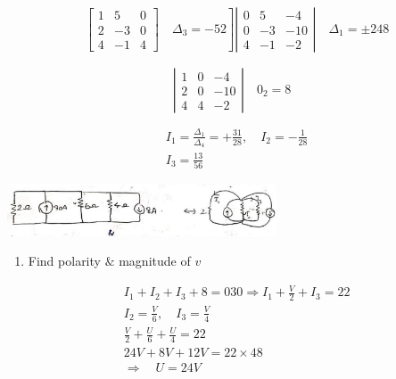 \documentclass[12pt, a4paper]{article}
\newcommand{\figwidth}{8cm}
\begin{document}
$$
	\begin{aligned}
		 & \left.\left[\begin{array}{ccc}
				               1 & 5  & 0 \\
				               2 & -3 & 0 \\
				               4 & -1 & 4
			               \end{array}\right] \quad \Delta_{3}=-52\right]\left|\begin{array}{ccc}
			                                                                   0 & 5  & -4  \\
			                                                                   0 & -3 & -10 \\
			                                                                   4 & -1 & -2
		                                                                   \end{array}\right| \quad \Delta_{1}= \pm 248
	\end{aligned}
$$

$$
	\left|\begin{array}{lll}
		1 & 0 & -4  \\
		2 & 0 & -10 \\
		4 & 4 & -2
	\end{array}\right| \quad 0_{2}=8
$$

$$
	\begin{aligned}
		 & I_{1}=\frac{\Delta_{1}}{\Delta_{4}}=+\frac{31}{28}, \quad I_{2}=-\frac{1}{28} \\
		 & I_{3}=\frac{13}{56}
	\end{aligned}
$$

\begin{center}
	\includegraphics[max width=\figwidth]{2024_06_15_f9b8f5fbbfa74e15de4eg-6(2)}
\end{center}

\begin{enumerate}
	\item Find polarity $\&$ magnitude of $v$
\end{enumerate}

$$
	\begin{aligned}
		 & I_{1}+I_{2}+I_{3}+8=030 \Rightarrow I_{1}+\frac{V}{2}+I_{3}=22 \\
		 & I_{2}=\frac{V}{6}, \quad I_{3}=\frac{V}{4}                     \\
		 & \frac{V}{2}+\frac{U}{6}+\frac{U}{4}=22                         \\
		 & 24 V+8 V+12 V=22 \times 48                                     \\
		 & \Rightarrow \quad U=24 V
	\end{aligned}
$$
\end{document}
